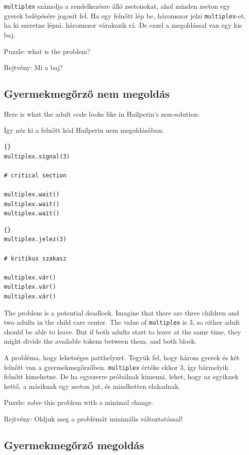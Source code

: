 \documentclass{book}
\newcommand{\clearemptydoublepage}{\newpage\cleardoublepage}
\begin{document}
{\tt multiplex} számolja a rendelkezésre álló zsetonokat, ahol
minden zseton egy gyerek belépésére jogosít fel. Ha egy felnőtt
lép be, háromszor jelzi {\tt multiplex}-et, ha ki szeretne lépni,
háromszor várakozik rá. De ezzel a megoldással van egy kis baj.

Puzzle: what is the problem?

Rejtvény: Mi a baj?

\clearemptydoublepage
\subsection{Gyermekmegőrző nem megoldás}

Here is what the adult code looks like in Hailperin's non-solution:

Így néz ki a felnőtt kód Hailperin nem megoldásában:

\begin{lstlisting}[title={Child care non-solution (adult)}]{}
multiplex.signal(3)

# critical section

multiplex.wait()
multiplex.wait()
multiplex.wait()
\end{lstlisting}

\begin{lstlisting}[title={Gyermekmegőrző nem megoldás (felnőtt)}]{}
multiplex.jelez(3)

# kritikus szakasz

multiplex.vár()
multiplex.vár()
multiplex.vár()
\end{lstlisting}

The problem is a potential deadlock.  Imagine that there are
three children and two adults in the child care center.  The
value of {\tt multiplex} is 3, so either adult should be able
to leave.  But if both adults start to leave at the same time,
they might divide the available tokens between them, and both
block.

A probléma, hogy lehetséges patthelyzet. Tegyük fel, hogy
három gyerek és két felnőtt van a gyermekmegőrzőben.
{\tt multiplex} értéke ekkor 3, így bármelyik felnőtt
kimehetne. De ha egyszerre próbálnak kimenni, lehet, hogy
az egyiknek kettő, a másiknak egy zseton jut, és mindketten
elakadnak.

Puzzle: solve this problem with a minimal change.

Rejtvény: Oldjuk meg a problémát minimális változtatással!

\clearemptydoublepage
\subsection{Gyermekmegőrző megoldás}
\end{document}
